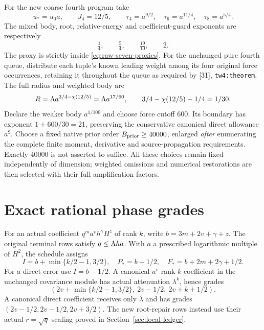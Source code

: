 \documentclass[11pt]{article}
\numberwithin{equation}{section}
\theoremstyle{remark}\newtheorem{remark}[theorem]{Remark}
\newcommand{\src}[1]{\texttt{\nolinkurl{#1}}}
\newcommand{\thirtyone}[1]{\textup{[31]}, \src{#1}}
\begin{document}
For the new coarse fourth program take
\begin{equation}\label{eq:parameters}
 u_*=u_0a,\qquad J_4=12/5,\qquad
 \tau_4=a^{9/2},\quad\tau_6=a^{11/4},\quad\tau_8=a^{5/4}.
\end{equation}
The mixed body, root, relative-energy and coefficient-guard exponents are respectively
\[
 \tfrac14,\qquad\tfrac54,\qquad\tfrac{19}{10},\qquad2.
\]
The proxy is strictly inside \eqref{eq:raw-seven-proxies}. For the unchanged pure fourth queue, distribute each tuple's known leading weight among its four original force occurrences, retaining it throughout the queue as required by \thirtyone{tw4:theorem}. The full radius and weighted body are
\begin{equation}\label{eq:purebody}
 R=\Lambda a^{3/4-\chi(12/5)}=\Lambda a^{17/60},
 \qquad 3/4-\chi(12/5)-1/4=1/30.
\end{equation}
Declare the weaker body $a^{1/100}$ and choose force cutoff $600$. Its boundary has exponent $1+600/30=21$, preserving the conservative canonical direct allowance $a^9$. Choose a fixed native prior order $B_{\rm prior}\ge40000$, enlarged \emph{after} enumerating the complete finite moment, derivative and source-propagation requirements. Exactly $40000$ is not asserted to suffice. All these choices remain fixed independently of dimension; weighted omissions and numerical restorations are then selected with their full amplification factors.

\section{Exact rational phase grades}
\label{sec:phaseledger}
For an actual coefficient $q^m a^v h^\gamma H^z$ of rank $k$, write $b=3m+2v+\gamma+z$. The original terminal rows satisfy $q\le\Lambda ha$. With $a$ a prescribed logarithmic multiple of $H^2$, the schedule assigns
\begin{equation}\label{eq:grades}
 I=b+\min\{k/2-1,3/2\},\quad
 P_*=b-1/2,\quad F_*=b+2m+2\gamma+1/2.
\end{equation}
For a direct error use $I=b-1/2$. A canonical $a^v$ rank-$k$ coefficient in the unchanged covariance module has actual attenuation $\lambda^k$, hence grades
\[
 (2v+\min\{k/2-1,3/2\},\ 2v-1/2,\ 2v+k+1/2).
\]
A canonical direct coefficient receives only $\lambda$ and has grades $(2v-1/2,2v-1/2,2v+3/2)$. The new root-repair rows instead use their actual $r=\sqrt q$ scaling proved in Section~\ref{sec:local-ledger}.
\end{document}
